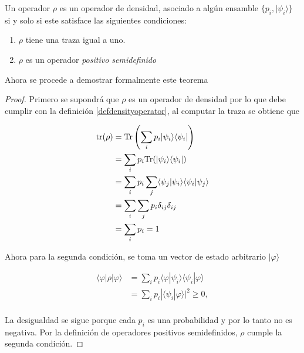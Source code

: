 \begin{theorem} Un operador $\rho$ es un operador de densidad, asociado a algún ensamble $\{p_i, |\psi_i\rangle\}$ si y solo si este satisface las siguientes condiciones:
\begin{enumerate}
	\item $\rho$ tiene una traza igual a uno.
	\item $\rho $ es un operador \textit{positivo semidefinido}
\end{enumerate}	
\end{theorem}


Ahora se procede a demostrar formalmente este teorema


\begin{proof}
	Primero se supondrá que $\rho $ es un operador de densidad por lo que debe cumplir con la definición {\ref{defdensityoperator}}, al computar la traza se obtiene que
	
	
	
	\begin{equation*}
		\begin{split}
			{\rm tr(\rho)}&={\rm Tr}\left(\sum_{i} p_i|\psi_i\rangle \langle \psi_i|\right) \\
			&=	\sum_{i}p_i {\rm Tr}(|\psi_i\rangle \langle \psi_i|)\\
			&=\sum_{i}p_i \sum_j\langle \psi_j|\psi_i\rangle \langle \psi_i|\psi_j\rangle\\
			&=\sum_{i}\sum_j p_i \delta_{ij} \delta_{ij}\\
			&=\sum_i p_i=1\\
		\end{split}
	\end{equation*}

Ahora para la segunda condición, se toma un vector de estado arbitrario $|\varphi \rangle$

 
\begin{equation*}
	\begin{split}
	\langle \varphi |	\rho|\varphi \rangle&=\sum_{i}p_i\langle \varphi |\psi_i\rangle \langle \psi_i|\varphi \rangle \\
	&=\sum_{i}p_i| \langle \psi_i|\varphi \rangle|^2 \ge 0,\\
	\end{split}
\end{equation*}

La desigualdad se sigue porque cada $p_i$ es una probabilidad y por lo tanto no es negativa. Por la definición de operadores positivos semidefinidos, $\rho$ cumple la segunda condición.



\end{proof}
